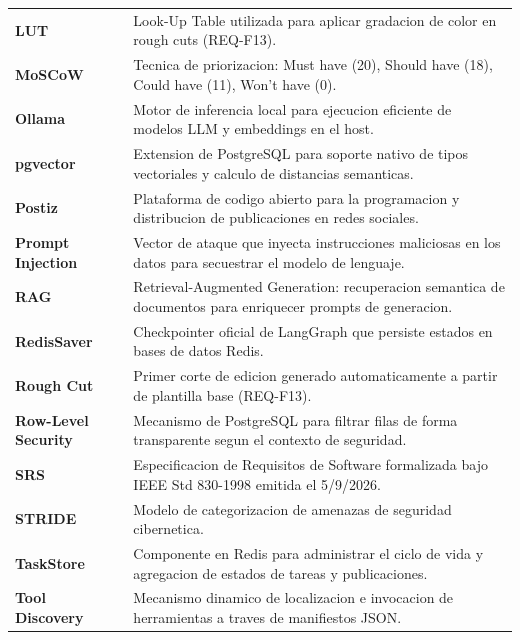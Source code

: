 \documentclass[11pt,a4paper]{article}
\begin{document}
\begin{longtable}{p{3.8cm}p{11.2cm}}
\textbf{LUT} & Look-Up Table utilizada para aplicar gradacion de color en rough cuts (REQ-F13). \\
\textbf{MoSCoW} & Tecnica de priorizacion: Must have (20), Should have (18), Could have (11), Won't have (0). \\
\textbf{Ollama} & Motor de inferencia local para ejecucion eficiente de modelos LLM y embeddings en el host. \\
\textbf{pgvector} & Extension de PostgreSQL para soporte nativo de tipos vectoriales y calculo de distancias semanticas. \\
\textbf{Postiz} & Plataforma de codigo abierto para la programacion y distribucion de publicaciones en redes sociales. \\
\textbf{Prompt Injection} & Vector de ataque que inyecta instrucciones maliciosas en los datos para secuestrar el modelo de lenguaje. \\
\textbf{RAG} & Retrieval-Augmented Generation: recuperacion semantica de documentos para enriquecer prompts de generacion. \\
\textbf{RedisSaver} & Checkpointer oficial de LangGraph que persiste estados en bases de datos Redis. \\
\textbf{Rough Cut} & Primer corte de edicion generado automaticamente a partir de plantilla base (REQ-F13). \\
\textbf{Row-Level Security} & Mecanismo de PostgreSQL para filtrar filas de forma transparente segun el contexto de seguridad. \\
\textbf{SRS} & Especificacion de Requisitos de Software formalizada bajo IEEE Std 830-1998 emitida el 5/9/2026. \\
\textbf{STRIDE} & Modelo de categorizacion de amenazas de seguridad cibernetica. \\
\textbf{TaskStore} & Componente en Redis para administrar el ciclo de vida y agregacion de estados de tareas y publicaciones. \\
\textbf{Tool Discovery} & Mecanismo dinamico de localizacion e invocacion de herramientas a traves de manifiestos JSON. \\
\end{longtable}
\end{document}
